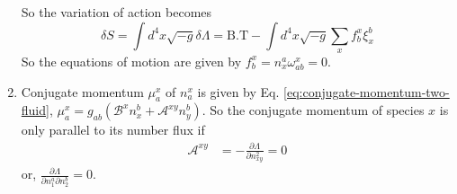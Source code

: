 \documentclass[10pt]{article}
\begin{document}
\begin{enumerate}
  So the variation of action becomes
  \begin{equation}
    \label{eq:variaons-action-two-fluid}
    \delta S = \int d^4x \sqrt{-g} \delta \Lambda = \textrm{B.T} - \int d^4x \sqrt{-g}\sum_{x} f_b^x \xi^b_x
  \end{equation}
So the equations of motion are given by $\boxed{f^x_b = n^a_x\omega^x_{ab} = 0}$.
\item Conjugate momentum $\mu_a^x$ of $n^x_a$ is given by Eq. \eqref{eq:conjugate-momentum-two-fluid}, $\mu_a^x = g_{ab}(\mathcal{B}^x n_x^b + \mathcal{A}^{xy}n^b_y)$. So the conjugate momentum of species $x$ is only parallel to its number flux if
  \begin{align}
    \label{eq:condition-for-parallel-to-its-number-flux}
    \mathcal{A}^{xy}
    & = -\frac{\partial \Lambda}{\partial n^2_{xy}} = 0 
  \end{align}
  or, $\boxed{\frac{\partial \Lambda}{\partial n^a_1 \partial n_2^b} = 0}$.
\end{enumerate}
\end{document}

